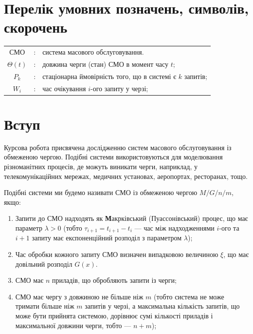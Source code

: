 \documentclass[14pt]{extarticle}
\begin{document}
\setcounter{tocdepth}{2}
\tableofcontents
\newpage

\section{Перелік умовних позначень, символів, скорочень}
\begin{table}[h!]
  \centering
  \begin{tabular}{ c c l }
    СМО &:& система масового обслуговування. \\
    \(\Theta(t)\) &:& довжина черги (стан) СМО в момент часу \(t\); \\
    \(P_{k}\) &:& стаціонарна ймовірність того, що в системі є \(k\) запитів; \\
    \(W_{i}\) &:& час очікування \(i\)-ого запиту у черзі; \\
  \end{tabular}
\end{table}

\newpage

\section{Вступ}\label{sec:intro}

Курсова робота присвячена дослідженню систем масового обслуговування із
обмеженою чергою. Подібні системи використовуються для моделювання різноманітних
процесів, де можуть виникати черги, наприклад, у телекомунікаційних мережах,
медичних установах, аеропортах, ресторанах, тощо.

Подібні системи ми будемо називати СМО із обмеженою чергою \(M/G/n/m\), якщо:

\begin{enumerate}
  \item Запити до СМО надходять як \textbf{М}акрківський (Пуассонівський)
        процес, що має параметр \(\lambda > 0\) (тобто \(\tau_{i+1} = t_{i+1} - t_{i}\) ---
        час між надходженнями \(i\)-ого та \(i+1\) запиту має експоненційний
        розподіл з параметром \(\lambda\));
  \item Час обробки кожного запиту СМО визначен випадковою величиною \(\xi\), що
        має довільний розподіл \(G(x)\).
  \item СМО має \(n\) приладів, що обробляють запити із черги;
  \item СМО має чергу з довжиною не більше ніж \(m\) (тобто система не може
        тримати більше ніж \(m\) запитів у черзі, а максимальна кількість
        запитів, що може бути прийнята системою, дорівнює сумі кількості
        приладів і максимальної довжини черги, тобто --- \(n + m\));
\end{enumerate}
\end{document}
